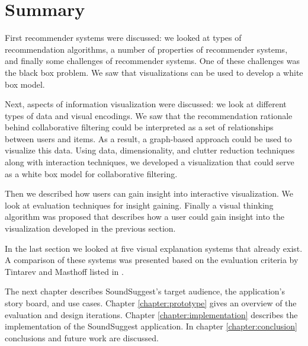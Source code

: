 \section{Summary}\label{chapter:literature_study:section:summary}

First recommender systems were discussed: we looked at types of recommendation algorithms, a number of properties of recommender systems, and finally some challenges of recommender systems. One of these challenges was the black box problem. We saw that visualizations can be used to develop a white box model.

Next, aspects of information visualization were discussed: we look at different types of data and visual encodings. We saw that the recommendation rationale behind collaborative filtering could be interpreted as a set of relationships between users and items. As a result, a graph-based approach could be used to visualize this data. Using data, dimensionality, and clutter reduction techniques along with interaction techniques, we developed a visualization that could serve as a white box model for collaborative filtering.

Then we described how users can gain insight into interactive visualization. We look at evaluation techniques for insight gaining. Finally a visual thinking algorithm was proposed that describes how a user could gain insight into the visualization developed in the previous section.

In the last section we looked at five visual explanation systems that already exist. A comparison of these systems was presented based on the evaluation criteria by Tintarev and Masthoff listed in \cite{tintarev:2007:SER:1547550.1547664}.

The next chapter describes SoundSuggest's target audience, the application's story board, and use cases. Chapter \ref{chapter:prototype} gives an overview of the evaluation and design iterations. Chapter \ref{chapter:implementation} describes the implementation of the SoundSuggest application. In chapter \ref{chapter:conclusion} conclusions and future work are discussed.





